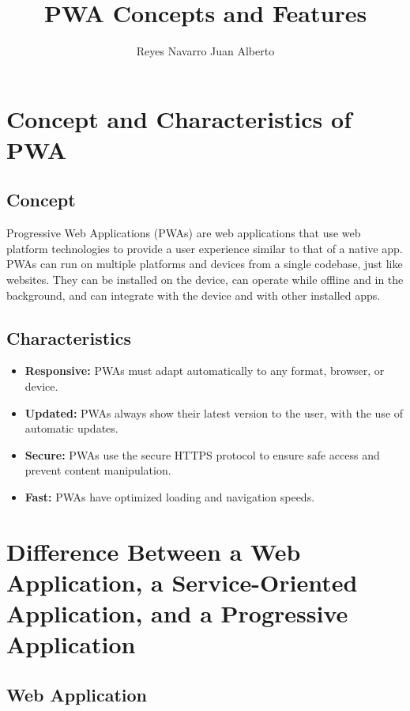 \documentclass{IEEEtran}
\begin{document}
	
	\title{PWA Concepts and Features}
	\author{Reyes Navarro Juan Alberto}
	
	\maketitle
	
	\section{Concept and Characteristics of PWA}
	
	\subsection{Concept}
	
	Progressive Web Applications (PWAs) are web applications that use web platform technologies to provide a user experience similar to that of a native app. PWAs can run on multiple platforms and devices from a single codebase, just like websites. They can be installed on the device, can operate while offline and in the background, and can integrate with the device and with other installed apps.
	
	\subsection{Characteristics}
	
	\begin{itemize}
		\item \textbf{Responsive:} PWAs must adapt automatically to any format, browser, or device.
		\item \textbf{Updated:} PWAs always show their latest version to the user, with the use of automatic updates.
		\item \textbf{Secure:} PWAs use the secure HTTPS protocol to ensure safe access and prevent content manipulation.
		\item \textbf{Fast:} PWAs have optimized loading and navigation speeds.
	\end{itemize}
	
	\section{Difference Between a Web Application, a Service-Oriented Application, and a Progressive Application}
	
	\subsection{Web Application}
	
\end{document}
